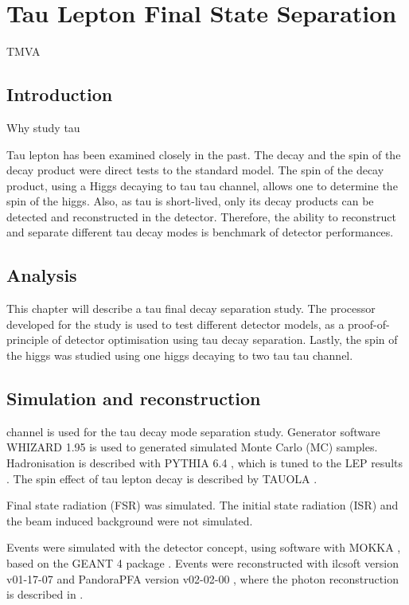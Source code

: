 \chapter{Tau Lepton Final State Separation}
\label{chap:Tau}

%
{TMVA}%


\section{Introduction}

Why study tau

Tau lepton has been examined closely in the past. The decay and the spin of the decay product were direct tests to the standard model. The spin of the decay product, using a Higgs decaying to tau tau channel, allows one to determine the spin of the higgs. Also, as tau is short-lived, only its decay products can be detected and reconstructed in the detector. Therefore, the ability to reconstruct and separate different tau decay modes is benchmark of detector performances.

\section{Analysis}

This chapter will describe a tau final decay separation study. The processor developed for the study is used to test different detector models, as a proof-of-principle of detector optimisation using tau decay separation. Lastly, the spin of the higgs was studied using one higgs decaying to two tau tau channel.


\section{Simulation and reconstruction}

\eeToTauTau channel is used for the tau decay mode separation study. Generator software WHIZARD 1.95 \cite{whizard} is used to generated simulated Monte Carlo (MC) samples. Hadronisation is described with PYTHIA 6.4 \cite{Sjostrand:1995iq}, which is tuned to the LEP results \cite{}. The spin effect of tau lepton decay is described by TAUOLA \cite{Jadach:1993hs}.

Final state radiation (FSR) was simulated. The initial state radiation (ISR) and the beam induced background were not simulated.

Events were simulated with the \CLICILD detector concept, using software with MOKKA \cite{MoradeFreitas:2002kj}, based on the GEANT 4 package  \cite{Agostinelli:2002hh}.
Events were reconstructed with  ilcsoft version v01-17-07 \cite{Gaede:82475} and PandoraPFA version v02-02-00 \cite{Marshall:2015rfa}, where the photon reconstruction is described in \cite{Xu:2016rcz}.
 
